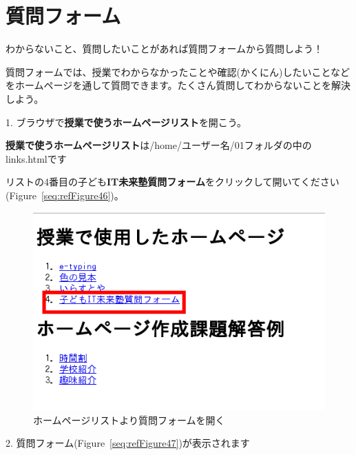 \newpage
\section{質問フォーム}

わからないこと、質問したいことがあれば質問フォームから質問しよう！

質問フォームでは、授業でわからなかったことや確認(かくにん)したいことなどをホームページを通して質問できます。たくさん質問してわからないことを解決しよう。

1.
ブラウザで\textbf{授業で使うホームページリスト}を開こう。

\textbf{授業で使うホームページリスト}は/home/ユーザー名/01フォルダの中のlinks.htmlです

リストの4番目の子ども\textbf{IT未来塾質問フォーム}をクリックして開いてください(Figure~\ref{seq:refFigure46})。


\begin{description}
    \item {}
\end{description}

\begin{figure}[H]
    \begin{center}
      \includegraphics[width=11.231cm,height=7.613cm]{text04-img/textbook-img245.png}
      \caption{ホームページリストより質問フォームを開く}
    \end{center}
    \label{fig:prog_menu}
\end{figure}

2.
質問フォーム(Figure~\ref{seq:refFigure47})が表示されます

